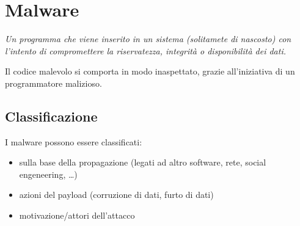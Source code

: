 \chapter{Malware}

\textit{Un programma che viene inserito in un sistema (solitamete di nascosto) 
con l'intento di compromettere la riservatezza, integrità o disponibilità dei dati.}

Il codice malevolo si comporta in modo inaspettato, grazie all'iniziativa di 
un programmatore malizioso.

\section{Classificazione}

I malware possono essere classificati:
\begin{itemize}
    \item sulla base della propagazione (legati ad altro software, rete, social engeneering, \dots)
    \item azioni del payload (corruzione di dati, furto di dati)
    \item motivazione/attori dell'attacco 
\end{itemize}

